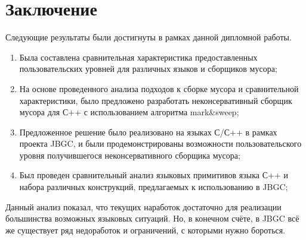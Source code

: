 \section{Заключение}

Следующие результаты были достигнуты в рамках данной дипломной работы. 

\begin{enumerate}
\item Была составлена сравнительная характеристика предоставленных пользовательских уровней для различных языков и сборщиков мусора;

\item На основе проведенного анализа подходов к сборке мусора и сравнительной характеристики, было предложено разработать неконсервативный сборщик мусора для С++ с использованием алгоритма mark\&sweep;
\item Предложенное решение было реализовано на языках С/С++ в рамках проекта JBGC, и были продемонстрированы возможности пользовательского уровня получившегося неконсервативного сборщика мусора;

\item Был проведен сравнительный анализ языковых примитивов языка С++ и набора различных конструкций, предлагаемых к использованию в JBGC;
\end{enumerate}

\vspace{0.3cm}
Данный анализ показал, что текущих наработок достаточно для реализации большинства возможных языковых ситуаций. Но, в конечном счёте, в JBGC всё же существует ряд недоработок и ограничений, с которыми нужно бороться.
